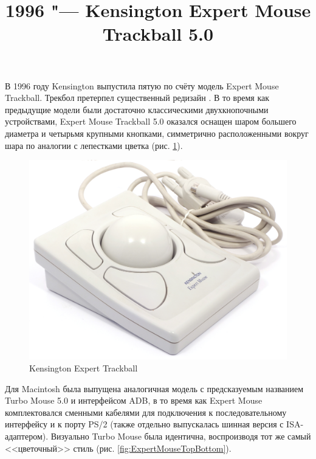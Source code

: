 \documentclass[11pt, a4paper]{article}
\begin{document}
\title{1996 "--- Kensington Expert Mouse Trackball 5.0}
\date{}
\maketitle
{}
В 1996 году Kensington выпустила пятую по счёту модель Expert Mouse Trackball. Трекбол претерпел существенный редизайн \cite{KensingtonPC}. В то время как предыдущие модели были достаточно классическими двухкнопочными устройствами, Expert Mouse Trackball 5.0 оказался оснащен шаром большего диаметра и четырьмя крупными кнопками, симметрично расположенными вокруг шара по аналогии с лепестками цветка (рис. \ref{fig:ExpertMousePic}).

\begin{figure}[h]
    \centering
    \includegraphics[scale=0.4]{1996_kensington_expert_trackball_5/pic_60.jpg}
    \caption{Kensington Expert Trackball}
    \label{fig:ExpertMousePic}
\end{figure}

Для Macintosh была выпущена аналогичная модель с предсказуемым названием Turbo Mouse 5.0 \cite{KensingtonMac} и интерфейсом ADB, в то время как Expert Mouse комплектовался сменными кабелями для подключения к последовательному интерфейсу и к порту PS/2 (также отдельно выпускалась шинная версия с ISA-адаптером). Визуально Turbo Mouse была идентична, воспроизводя тот же самый <<цветочный>> стиль (рис. \ref{fig:ExpertMouseTopBottom}).
\end{document}
